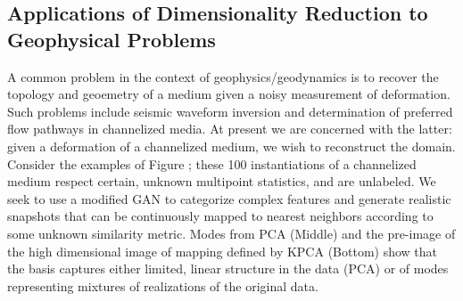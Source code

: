 \documentclass{article}
\begin{document}
\subsection{Applications of Dimensionality Reduction to Geophysical Problems }\label{intokpca}
	A common problem in the context of geophysics/geodynamics is to recover the topology and geoemetry of a medium given a noisy measurement of deformation.  Such problems include seismic waveform inversion and determination of preferred flow pathways in channelized media.  At present we are concerned with the latter: given a deformation of a channelized medium, we wish to reconstruct the domain.  Consider the examples of Figure \label{Snapshots}; these 100 instantiations of a channelized medium respect certain, unknown multipoint statistics, and are unlabeled. We seek to use a modified GAN to categorize complex features and generate realistic snapshots that can be continuously mapped to nearest neighbors according to some unknown similarity metric.  Modes from PCA (Middle) and  the pre-image of the high dimensional image of mapping defined by KPCA (Bottom) show that the basis captures either limited, linear structure in the data (PCA) or of modes representing mixtures of realizations of the original data.
    
\end{document}
